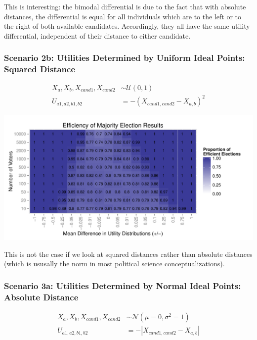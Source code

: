\documentclass[12pt]{article}\usepackage[]{graphicx}\usepackage[]{color}
\makeatletter
\def\maxwidth{ %
  \ifdim\Gin@nat@width>\linewidth
    \linewidth
  \else
    \Gin@nat@width
  \fi
}
\newenvironment{knitrout}{}{} %
\makeatother
\begin{document}
This is interesting: the bimodal differential is due to the fact that with absolute distances, the differential is equal for all individuals which are to the left or to the right of both available candidates. Accordingly, they all have the same utility differential, independent of their distance to either candidate.

\clearpage
\subsubsection*{Scenario 2b: Utilities Determined by Uniform Ideal Points: Squared Distance}

\begin{align*}
X_a,X_b,X_{cand1},X_{cand2} &\sim \mathcal{U}(0,1) \\
U_{a1,a2,b1,b2} &= -(X_{cand1,cand2}-X_{a,b})^2
\end{align*}

\begin{knitrout}
\color{fgcolor}
\includegraphics[width=\maxwidth]{figure/unnamed-chunk-5} 

\end{knitrout}


This is not the case if we look at squared distances rather than absolute distances (which is ususally the norm in most political science conceptualizations).

\clearpage
\subsubsection*{Scenario 3a: Utilities Determined by Normal Ideal Points: Absolute Distance}
\begin{align*}
X_a,X_b,X_{cand1},X_{cand2} &\sim \mathcal{N}(\mu=0,\sigma^2=1) \\
U_{a1,a2,b1,b2} &= -|X_{cand1,cand2}-X_{a,b}|
\end{align*}
\end{document}
